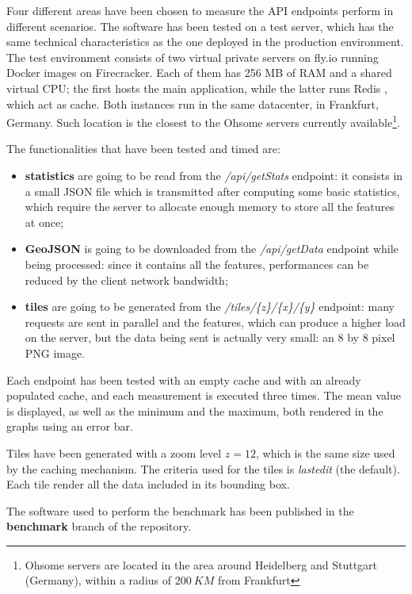 \documentclass{Configuration_Files/PoliMi3i_thesis}
\begin{document}
Four different areas have been chosen to measure the API endpoints perform in different scenarios. The software has been tested on a test server, which has the same technical characteristics as the one deployed in the production environment. The test environment consists of two virtual private servers on fly.io running Docker images on Firecracker. Each of them has 256 MB of RAM and a shared virtual CPU; the first hosts the main application, while the latter runs Redis \cite{RedisInternals2022}, which act as cache. Both instances run in the same datacenter, in Frankfurt, Germany. Such location is the closest to the Ohsome servers currently available\footnote{Ohsome servers are located in the area around Heidelberg and Stuttgart (Germany), within a radius of $ \SI{200}{KM} $ from Frankfurt}.

The functionalities that have been tested and timed are:
\begin{itemize}
\item \textbf{statistics} are going to be read from the \textit{/api/getStats} endpoint: it consists in a small JSON file which is transmitted after computing some basic statistics, which require the server to allocate enough memory to store all the features at once;
\item \textbf{GeoJSON} is going to be downloaded from the \textit{/api/getData} endpoint while being processed: since it contains all the features, performances can be reduced by the client network bandwidth;
\item \textbf{tiles} are going to be generated from the \textit{/tiles/\{z\}/\{x\}/\{y\}} endpoint: many requests are sent in parallel and the features, which can produce a higher load on the server, but the data being sent is actually very small: an 8 by 8 pixel PNG image.
\end{itemize}

Each endpoint has been tested with an empty cache and with an already populated cache, and each measurement is executed three times. The mean value is displayed, as well as the minimum and the maximum, both rendered in the graphs using an error bar.

Tiles have been generated with a zoom level $ z = 12 $, which is the same size used by the caching mechanism. The criteria used for the tiles is \textit{lastedit} (the default). Each tile render all the data included in its bounding box.

The software used to perform the benchmark has been published in the \textbf{benchmark} branch of the repository.
\end{document}
